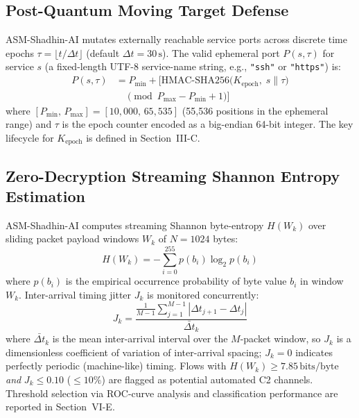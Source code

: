 \documentclass{ieeeaccess}
\renewcommand{\_}{\textunderscore\allowbreak}
\begin{document}
\subsection{Post-Quantum Moving Target Defense}
ASM-Shadhin-AI mutates externally reachable service ports across discrete time
epochs $\tau = \lfloor t / \Delta t \rfloor$ (default $\Delta t = 30\,\text{s}$).
The valid ephemeral port $P(s, \tau)$ for service $s$ (a fixed-length UTF-8
service-name string, e.g., \texttt{"ssh"} or \texttt{"https"}) is:
\begin{align}
  P(s, \tau) &= P_{\min} + \Big[\text{HMAC-SHA256}\big(K_{\text{epoch}},\; s \| \tau\big)
               \nonumber \\
              &\quad \pmod{P_{\max} - P_{\min} + 1}\Big]
  \label{eq:mtd}
\end{align}
where $[P_{\min},\, P_{\max}] = [10{,}000,\, 65{,}535]$ (55{,}536 positions in the
ephemeral range) and $\tau$ is the epoch counter encoded as a big-endian
64-bit integer. The key lifecycle for $K_{\text{epoch}}$ is defined in
Section~III-C.

\subsection{Zero-Decryption Streaming Shannon Entropy Estimation}
ASM-Shadhin-AI computes streaming Shannon byte-entropy $H(W_k)$ over sliding
packet payload windows $W_k$ of $N = 1024$ bytes:
\begin{equation}
  H(W_k) = -\sum_{i=0}^{255} p(b_i) \log_2 p(b_i)
  \label{eq:entropy}
\end{equation}
where $p(b_i)$ is the empirical occurrence probability of byte value $b_i$
in window $W_k$. Inter-arrival timing jitter $J_k$ is monitored concurrently:
\begin{equation}
  J_k = \frac{\frac{1}{M-1}\sum_{j=1}^{M-1} \left|\Delta t_{j+1} - \Delta t_j\right|}{\bar{\Delta t}_k}
  \label{eq:jitter}
\end{equation}
where $\bar{\Delta t}_k$ is the mean inter-arrival interval over the $M$-packet
window, so $J_k$ is a dimensionless coefficient of variation of inter-arrival
spacing; $J_k = 0$ indicates perfectly periodic (machine-like) timing. Flows
with $H(W_k) \ge 7.85\,\text{bits/byte}$ \emph{and} $J_k \le 0.10$ ($\le 10\%$)
are flagged as potential automated C2 channels. Threshold selection via
ROC-curve analysis and classification performance are reported in
Section~VI-E.
\end{document}
